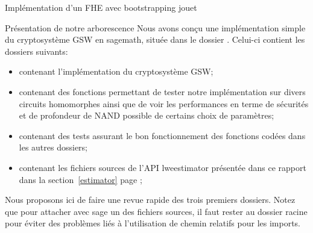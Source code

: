 \begin{section}{Implémentation d'un FHE avec bootstrapping \og{}jouet\fg~{}}
\begin{subsection}{Présentation de notre arborescence}
Nous avons conçu une implémentation simple du cryptosystème GSW en sagemath, située dans le dossier
. Celui-ci contient les  dossiers suivants:
\begin{itemize}
\item {} contenant l'implémentation du cryptosystème GSW;
\item {} contenant des fonctions permettant 
	de tester notre implémentation sur divers circuits homomorphes ainsi que de voir les performances en terme
	de sécurités et de profondeur de NAND possible de certains choix de paramètres;
\item {} contenant des tests assurant le bon fonctionnement
	des fonctions codées dans les autres dossiers; 
\item {} contenant les fichiers sources de l'API
	 lwe\textunderscore estimator présentée dans ce rapport dans la section~\ref{estimator} page \pageref{estimator}; 
\end{itemize}

Nous proposons ici de faire une revue rapide des trois premiers dossiers. Notez que pour
attacher avec sage un des fichiers sources, il faut rester au dossier racine pour
éviter des problèmes liés à l'utilisation de chemin relatifs pour les imports.



\end{subsection}
\end{section}

